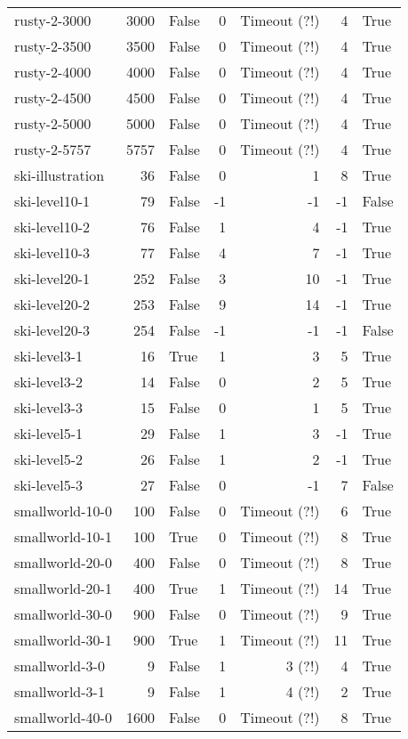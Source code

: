 \begin{longtable}{lrlrrrl}
rusty-2-3000 & 3000 & False & 0 & Timeout (?!) & 4 & True \\
rusty-2-3500 & 3500 & False & 0 & Timeout (?!) & 4 & True \\
rusty-2-4000 & 4000 & False & 0 & Timeout (?!) & 4 & True \\
rusty-2-4500 & 4500 & False & 0 & Timeout (?!) & 4 & True \\
rusty-2-5000 & 5000 & False & 0 & Timeout (?!) & 4 & True \\
rusty-2-5757 & 5757 & False & 0 & Timeout (?!) & 4 & True \\
ski-illustration & 36 & False & 0 & 1 & 8 & True \\
ski-level10-1 & 79 & False & -1 & -1 & -1 & False \\
ski-level10-2 & 76 & False & 1 & 4 & -1 & True \\
ski-level10-3 & 77 & False & 4 & 7 & -1 & True \\
ski-level20-1 & 252 & False & 3 & 10 & -1 & True \\
ski-level20-2 & 253 & False & 9 & 14 & -1 & True \\
ski-level20-3 & 254 & False & -1 & -1 & -1 & False \\
ski-level3-1 & 16 & True & 1 & 3 & 5 & True \\
ski-level3-2 & 14 & False & 0 & 2 & 5 & True \\
ski-level3-3 & 15 & False & 0 & 1 & 5 & True \\
ski-level5-1 & 29 & False & 1 & 3 & -1 & True \\
ski-level5-2 & 26 & False & 1 & 2 & -1 & True \\
ski-level5-3 & 27 & False & 0 & -1 & 7 & False \\
smallworld-10-0 & 100 & False & 0 & Timeout (?!) & 6 & True \\
smallworld-10-1 & 100 & True & 0 & Timeout (?!) & 8 & True \\
smallworld-20-0 & 400 & False & 0 & Timeout (?!) & 8 & True \\
smallworld-20-1 & 400 & True & 1 & Timeout (?!) & 14 & True \\
smallworld-30-0 & 900 & False & 0 & Timeout (?!) & 9 & True \\
smallworld-30-1 & 900 & True & 1 & Timeout (?!) & 11 & True \\
smallworld-3-0 & 9 & False & 1 & 3 (?!) & 4 & True \\
smallworld-3-1 & 9 & False & 1 & 4 (?!) & 2 & True \\
smallworld-40-0 & 1600 & False & 0 & Timeout (?!) & 8 & True \\

\end{longtable}
